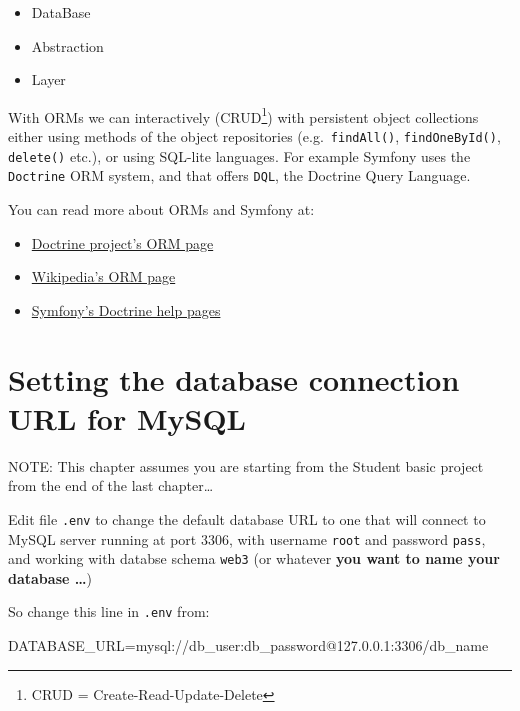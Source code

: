 \documentclass[a4paperpaper,openright]{book}
\newenvironment{Shaded}{}{}
\newcommand{\ExtensionTok}[1]{#1}
\newcommand{\NormalTok}[1]{#1}
\newcommand{\VariableTok}[1]{\textcolor[rgb]{0.10,0.09,0.49}{#1}}
\providecommand{\tightlist}{%
  \setlength{\itemsep}{0pt}\setlength{\parskip}{0pt}}
\begin{document}
\begin{itemize}
\tightlist
\item
  DataBase
\item
  Abstraction
\item
  Layer
\end{itemize}

With ORMs we can interactively (CRUD\footnote{CRUD =
  Create-Read-Update-Delete}) with persistent object collections either
using methods of the object repositories (e.g.~\texttt{findAll()},
\texttt{findOneById()}, \texttt{delete()} etc.), or using SQL-lite
languages. For example Symfony uses the \texttt{Doctrine} ORM system,
and that offers \texttt{DQL}, the Doctrine Query Language.

You can read more about ORMs and Symfony at:

\begin{itemize}
\tightlist
\item
  \href{http://www.doctrine-project.org/projects/orm.html}{Doctrine
  project's ORM page}
\item
  \href{https://en.wikipedia.org/wiki/Object-relational_mapping}{Wikipedia's
  ORM page}
\item
  \href{https://symfony.com/doc/current/doctrine.html}{Symfony's
  Doctrine help pages}
\end{itemize}

\hypertarget{setting-the-database-connection-url-for-mysql}{%
\section{Setting the database connection URL for
MySQL}\label{setting-the-database-connection-url-for-mysql}}

NOTE: This chapter assumes you are starting from the Student basic
project from the end of the last chapter\ldots{}

Edit file \texttt{.env} to change the default database URL to one that
will connect to MySQL server running at port 3306, with username
\texttt{root} and password \texttt{pass}, and working with databse
schema \texttt{web3} (or whatever \textbf{you want to name your database
\ldots{}})

So change this line in \texttt{.env} from:

\begin{Shaded}
\begin{Highlighting}[]
    \VariableTok{DATABASE_URL=}\NormalTok{mysql://db_user:db_password}\ExtensionTok{@127.0.0.1}\NormalTok{:3306/db_name}
\end{Highlighting}
\end{Shaded}
\end{document}
